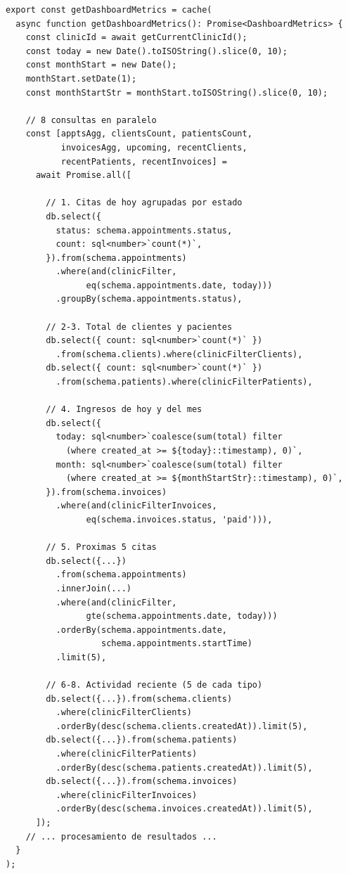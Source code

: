 \begin{lstlisting}[style=typescript, caption=getDashboardMetrics - Consultas paralelas]
export const getDashboardMetrics = cache(
  async function getDashboardMetrics(): Promise<DashboardMetrics> {
    const clinicId = await getCurrentClinicId();
    const today = new Date().toISOString().slice(0, 10);
    const monthStart = new Date();
    monthStart.setDate(1);
    const monthStartStr = monthStart.toISOString().slice(0, 10);

    // 8 consultas en paralelo
    const [apptsAgg, clientsCount, patientsCount,
           invoicesAgg, upcoming, recentClients,
           recentPatients, recentInvoices] =
      await Promise.all([

        // 1. Citas de hoy agrupadas por estado
        db.select({
          status: schema.appointments.status,
          count: sql<number>`count(*)`,
        }).from(schema.appointments)
          .where(and(clinicFilter,
                eq(schema.appointments.date, today)))
          .groupBy(schema.appointments.status),

        // 2-3. Total de clientes y pacientes
        db.select({ count: sql<number>`count(*)` })
          .from(schema.clients).where(clinicFilterClients),
        db.select({ count: sql<number>`count(*)` })
          .from(schema.patients).where(clinicFilterPatients),

        // 4. Ingresos de hoy y del mes
        db.select({
          today: sql<number>`coalesce(sum(total) filter
            (where created_at >= ${today}::timestamp), 0)`,
          month: sql<number>`coalesce(sum(total) filter
            (where created_at >= ${monthStartStr}::timestamp), 0)`,
        }).from(schema.invoices)
          .where(and(clinicFilterInvoices,
                eq(schema.invoices.status, 'paid'))),

        // 5. Proximas 5 citas
        db.select({...})
          .from(schema.appointments)
          .innerJoin(...)
          .where(and(clinicFilter,
                gte(schema.appointments.date, today)))
          .orderBy(schema.appointments.date,
                   schema.appointments.startTime)
          .limit(5),

        // 6-8. Actividad reciente (5 de cada tipo)
        db.select({...}).from(schema.clients)
          .where(clinicFilterClients)
          .orderBy(desc(schema.clients.createdAt)).limit(5),
        db.select({...}).from(schema.patients)
          .where(clinicFilterPatients)
          .orderBy(desc(schema.patients.createdAt)).limit(5),
        db.select({...}).from(schema.invoices)
          .where(clinicFilterInvoices)
          .orderBy(desc(schema.invoices.createdAt)).limit(5),
      ]);
    // ... procesamiento de resultados ...
  }
);
\end{lstlisting}

